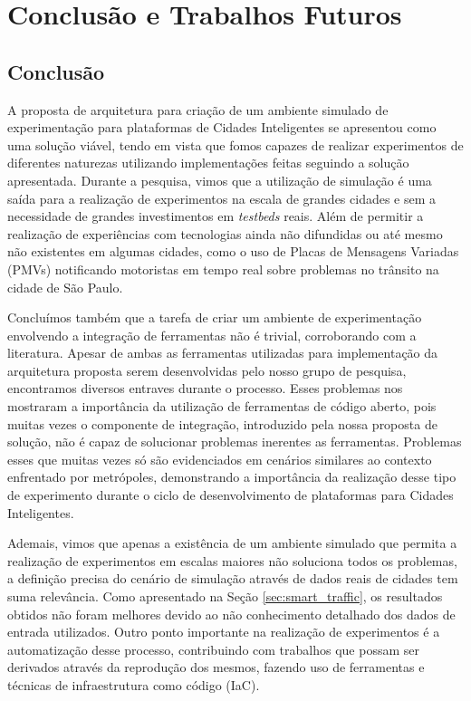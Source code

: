 \chapter{Conclusão e Trabalhos Futuros}
\label{cap:conclusao}

\section{Conclusão}

%
%
%

A proposta de arquitetura para criação de um ambiente simulado de experimentação para plataformas de Cidades Inteligentes se apresentou como uma solução viável, tendo em vista que fomos capazes de
realizar experimentos de diferentes naturezas utilizando implementações feitas seguindo a solução apresentada.
Durante a pesquisa, vimos que a utilização de simulação é uma saída para a realização de experimentos na escala de grandes cidades e sem a necessidade de grandes investimentos em \textit{testbeds} reais.
Além de permitir a realização de experiências com tecnologias ainda não difundidas ou até mesmo não existentes em algumas cidades, como o uso de Placas de Mensagens Variadas (PMVs) notificando motoristas
em tempo real sobre problemas no trânsito na cidade de São Paulo.

Concluímos também que a tarefa de criar um ambiente de experimentação envolvendo a integração de ferramentas não é trivial, corroborando com a literatura.
Apesar de ambas as ferramentas utilizadas para implementação da arquitetura proposta serem desenvolvidas pelo nosso grupo de pesquisa, encontramos diversos entraves durante o processo.
Esses problemas nos mostraram a importância da utilização de ferramentas de código aberto, pois muitas vezes o componente de integração, introduzido pela nossa proposta de solução, não é capaz de
solucionar problemas inerentes as ferramentas.
Problemas esses que muitas vezes só são evidenciados em cenários similares ao contexto enfrentado por metrópoles, demonstrando a importância da realização desse tipo de experimento durante o ciclo de
desenvolvimento de plataformas para Cidades Inteligentes.

Ademais, vimos que apenas a existência de um ambiente simulado que permita a realização de experimentos em escalas maiores não soluciona todos os problemas, a definição precisa do cenário de simulação
através de dados reais de cidades tem suma relevância.
Como apresentado na Seção \ref{sec:smart_traffic}, os resultados obtidos não foram melhores devido ao não conhecimento detalhado dos dados de entrada utilizados.
Outro ponto importante na realização de experimentos é a automatização desse processo, contribuindo com trabalhos que possam ser derivados através da reprodução dos mesmos, fazendo uso de ferramentas
e técnicas de infraestrutura como código (IaC).

